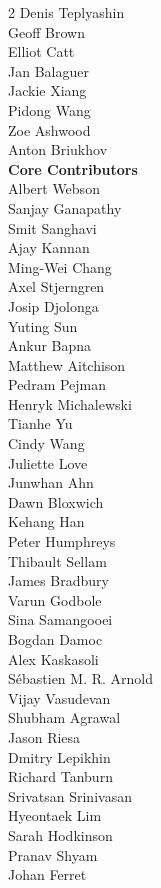 \begin{multicols}{2}
Denis Teplyashin \\
Geoff Brown \\
Elliot Catt \\
Jan Balaguer \\
Jackie Xiang \\
Pidong Wang \\
Zoe Ashwood \\
Anton Briukhov \\
\noindent
\textbf{Core Contributors} \\
Albert Webson \\
Sanjay Ganapathy \\
Smit Sanghavi \\
Ajay Kannan \\
Ming-Wei Chang \\
Axel Stjerngren \\
Josip Djolonga \\
Yuting Sun \\
Ankur Bapna \\
Matthew Aitchison \\
Pedram Pejman \\
Henryk Michalewski \\
Tianhe Yu \\
Cindy Wang \\
Juliette Love \\
Junwhan Ahn \\
Dawn Bloxwich \\
Kehang Han \\
Peter Humphreys \\
Thibault Sellam \\
James Bradbury \\
Varun Godbole \\
Sina Samangooei \\
Bogdan Damoc \\
Alex Kaskasoli \\
Sébastien M. R. Arnold \\
Vijay Vasudevan \\
Shubham Agrawal \\
Jason Riesa \\
Dmitry Lepikhin \\
Richard Tanburn \\
Srivatsan Srinivasan \\
Hyeontaek Lim \\
Sarah Hodkinson \\
Pranav Shyam \\
Johan Ferret \\

\end{multicols}
